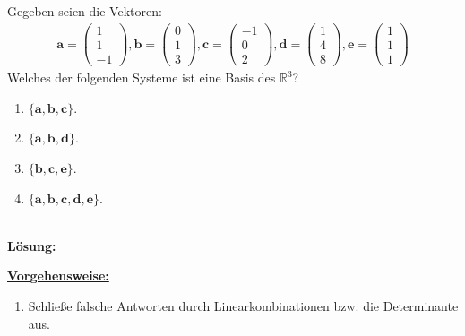 \subsection*{}
Gegeben seien die Vektoren:
\begin{align*}
\textbf{a}
=
\begin{pmatrix}
1 \\ 1 \\ -1
\end{pmatrix},
\textbf{b}
=
\begin{pmatrix}
0 \\ 1 \\ 3
\end{pmatrix},
\textbf{c}
=
\begin{pmatrix}
-1 \\ 0 \\ 2
\end{pmatrix},
\textbf{d}
=
\begin{pmatrix}
1 \\ 4 \\ 8
\end{pmatrix},
\textbf{e}
=
\begin{pmatrix}
1 \\ 1 \\ 1
\end{pmatrix}
\end{align*}
Welches der folgenden Systeme ist eine Basis des $ \mathbb{R}^3 $?
\renewcommand{\labelenumi}{(\alph{enumi})}
\begin{enumerate}
	\item 
	$ \lbrace \textbf{a}, \textbf{b} , \textbf{c} \rbrace  $.
	\item
	$ \lbrace \textbf{a}, \textbf{b} , \textbf{d} \rbrace  $.
	
	\item
	$ \lbrace \textbf{b}, \textbf{c} , \textbf{e} \rbrace  $.
	\item
	$ \lbrace \textbf{a}, \textbf{b} , \textbf{c},\textbf{d}, \textbf{e} \rbrace  $.
\end{enumerate}
\ \\
\textbf{Lösung:}
\begin{mdframed}
	\underline{\textbf{Vorgehensweise:}}
	\renewcommand{\labelenumi}{\theenumi.}
	\begin{enumerate}
		\item Schließe falsche Antworten durch Linearkombinationen bzw. die Determinante aus.
	\end{enumerate}
\end{mdframed}

